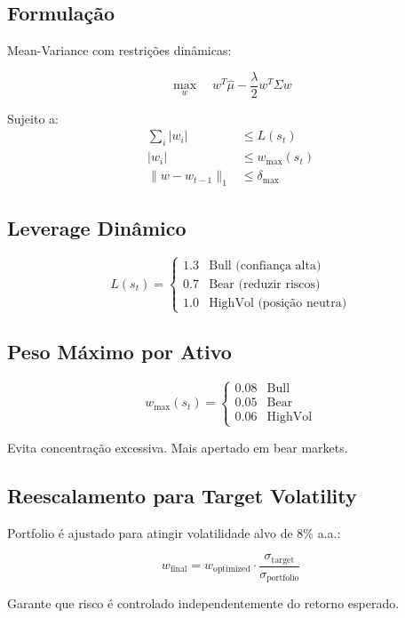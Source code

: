 \documentclass[12pt,a4paper]{article}
\begin{document}
\subsection{Formulação}

Mean-Variance com restrições dinâmicas:

\[
\max_w \quad w^T \hat{\mu} - \frac{\lambda}{2} w^T \Sigma w
\]

Sujeito a:
\begin{align}
\sum_i |w_i| &\leq L(s_t) \\
|w_i| &\leq w_{\max}(s_t) \\
\|w - w_{t-1}\|_1 &\leq \delta_{\max}
\end{align}

\subsection{Leverage Dinâmico}

\[
L(s_t) = \begin{cases}
1.3 & \text{Bull (confiança alta)} \\
0.7 & \text{Bear (reduzir riscos)} \\
1.0 & \text{HighVol (posição neutra)}
\end{cases}
\]

\subsection{Peso Máximo por Ativo}

\[
w_{\max}(s_t) = \begin{cases}
0.08 & \text{Bull} \\
0.05 & \text{Bear} \\
0.06 & \text{HighVol}
\end{cases}
\]

Evita concentração excessiva. Mais apertado em bear markets.

\subsection{Reescalamento para Target Volatility}

Portfolio é ajustado para atingir volatilidade alvo de 8\% a.a.:

\[
w_{\text{final}} = w_{\text{optimized}} \cdot \frac{\sigma_{\text{target}}}{\sigma_{\text{portfolio}}}
\]

Garante que risco é controlado independentemente do retorno esperado.
\end{document}
